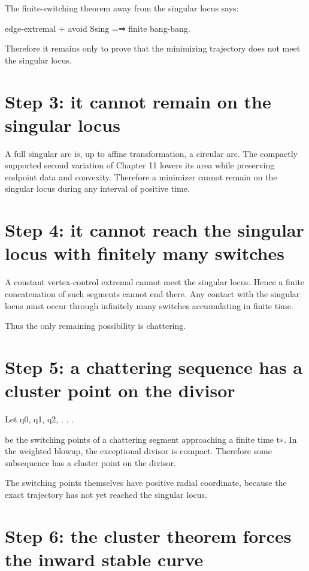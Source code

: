The finite-switching theorem away from the singular locus says:


\begin{displaytext}
edge-extremal + avoid Ssing =⇒ finite bang-bang.
\end{displaytext}

Therefore it remains only to prove that the minimizing trajectory does not meet the singular locus.


\section{Step 3: it cannot remain on the singular locus}

A full singular arc is, up to affine transformation, a circular arc. The compactly supported second variation of Chapter 11 lowers its area while preserving endpoint data and convexity. Therefore a minimizer cannot remain on the singular locus during any interval of positive time.


\section{Step 4: it cannot reach the singular locus with finitely many switches}

A constant vertex-control extremal cannot meet the singular locus. Hence a finite concatenation of such segments cannot end there. Any contact with the singular locus must occur through infinitely many switches accumulating in finite time.


Thus the only remaining possibility is chattering.


\section{Step 5: a chattering sequence has a cluster point on the divisor}

Let q0, q1, q2, . . .


be the switching points of a chattering segment approaching a finite time t∗. In the weighted blowup, the exceptional divisor is compact. Therefore some subsequence has a cluster point on the divisor.


The switching points themselves have positive radial coordinate, because the exact trajectory has not yet reached the singular locus.


\section{Step 6: the cluster theorem forces the inward stable curve}

